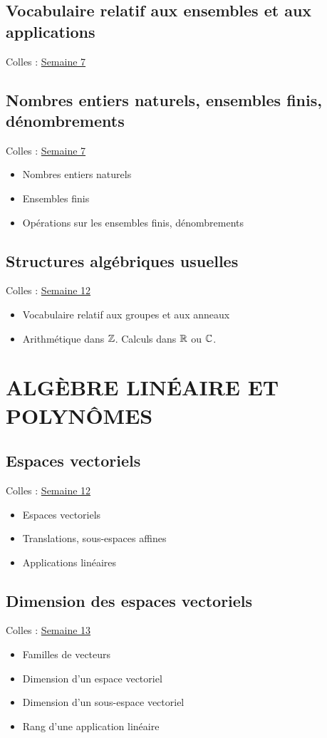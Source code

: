 \subsection{Vocabulaire relatif aux ensembles et aux applications}
Colles : \href{S7.pdf}{Semaine 7}

\subsection{Nombres entiers naturels, ensembles finis,
d\'enombrements}

Colles : \href{S7.pdf}{Semaine 7}
\begin{itemize}
\item Nombres entiers naturels
\item Ensembles finis
\item Op\'erations sur les ensembles finis, d\'enombrements
\end{itemize}

\subsection{Structures alg\'ebriques usuelles}
Colles : \href{S12.pdf}{Semaine 12}
\begin{itemize}
\item Vocabulaire relatif aux groupes et aux anneaux
\item  Arithm\'etique dans $\Bbb{Z}$. Calculs dans $\Bbb{R}$ ou $\Bbb{C}$.
\end{itemize}

\section{ALG\`EBRE LIN\'EAIRE ET POLYN\^OMES}

\subsection{Espaces vectoriels}
Colles : \href{S12.pdf}{Semaine 12}
\begin{itemize}
\item Espaces vectoriels
\item Translations, sous-espaces affines
\item Applications lin\'eaires
\end{itemize}

\subsection{Dimension des espaces vectoriels}
Colles : \href{S13.pdf}{Semaine 13}
\begin{itemize}
\item Familles de vecteurs
\item Dimension d'un espace vectoriel
\item Dimension d'un sous-espace vectoriel
\item Rang d'une application lin\'eaire
\end{itemize}

